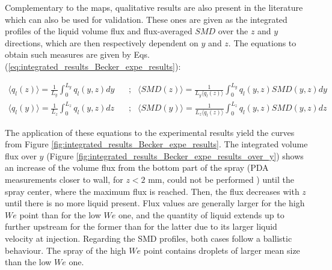 Complementary to the maps, qualitative results are also present in the literature which can also be used for validation. These ones are given as the integrated profiles of the liquid volume flux and flux-averaged $SMD$ over the $z$ and $y$ directions, which are then respectively dependent on $y$ and $z$. The equations to obtain such measures are given by Eqs. (\ref{eq:integrated_results_Becker_expe_results}):


\begin{subequations}
\label{eq:integrated_results_Becker_expe_results}
\begin{align}
\langle q_l \left( z \right) \rangle = \frac{1}{L_y} \int_0^{L_y} q_l \left( y, z \right) dy    & ~~~~  ; & \langle SMD \left( z \right) \rangle = \frac{1}{L_y \langle q_l \left( z \right) \rangle} \int_0^{L_y} q_l \left( y, z \right) SMD \left( y, z \right) dy \\
\langle q_l \left( y \right) \rangle = \frac{1}{L_z} \int_0^{L_z} q_l \left( y, z \right) dz    & ~~~~  ; & \langle SMD \left( y \right) \rangle =  \frac{1}{L_z \langle q_l \left( z \right) \rangle} \int_0^{L_z} q_l \left( y, z \right) SMD \left( y, z \right) dz
\end{align}
\end{subequations}

%

The application of these equations to the experimental results yield the curves from Figure \ref{fig:integrated_results_Becker_expe_results}. The integrated volume flux over $y$ (Figure \ref{fig:integrated_results_Becker_expe_results_over_y}) shows an increase of the volume flux from the bottom part of the spray (PDA measurements closer to wall, for $z < 2$ mm, could not be performed ) until the spray center, where the maximum flux is reached. Then, the flux decreases with $z$ until there is no more liquid present. Flux values are generally larger for the high $We$ point than for the low $We$ one, and the quantity of liquid extends up to further upstream for the former than for the latter due to its larger liquid velocity at injection. Regarding the SMD profiles, both cases follow a ballistic behaviour. The spray of the high $We$ point contains droplets of larger mean size than the low $We$ one.

